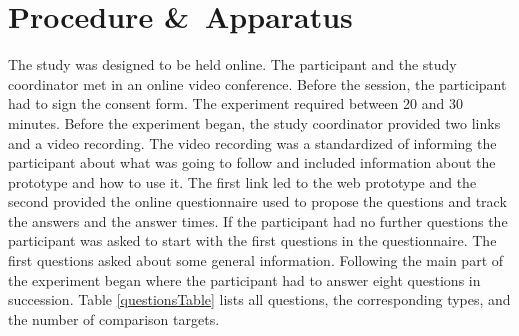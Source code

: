 \section{Procedure \&\ Apparatus}
The study was designed to be held online. The participant and the study coordinator met in an online video conference. Before the session,
the participant had to sign the consent form. The experiment required between 20 and 30 minutes. Before the experiment began, the
study coordinator provided two links and a video recording. The video recording was a standardized of informing the participant about what was
going to follow and included information about the prototype and how to use it. The first link led to the web prototype and the second
provided the online questionnaire used to propose the questions and track the answers and the answer times. If the participant had no further
questions the participant was asked to start with the first questions in the questionnaire. The first questions asked about some general
information. Following the main part of the experiment began where the participant had to answer eight questions in succession. Table
\ref{questionsTable} lists all questions, the corresponding types, and the number of comparison targets.
